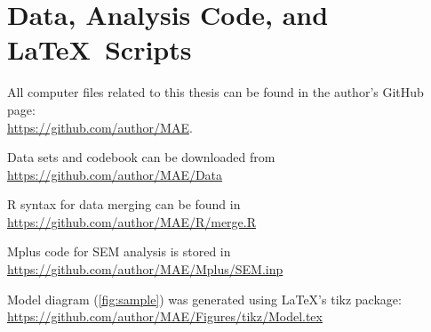 \section{Data, Analysis Code, and \LaTeX\ Scripts}
\label{app:B}

\MAEindent

All computer files related to this thesis can be found in the author's GitHub page:\\
\href{https://github.com/author/MAE}{https://github.com/author/MAE}.

\begin{MAEitemize}
\item Data sets and codebook can be downloaded from \href{https://github.com/author/MAE/Data}{https://github.com/author/MAE/Data}
\item R syntax for data merging can be found in \href{https://github.com/author/MAE/R/merge.R}{https://github.com/author/MAE/R/merge.R}
\item Mplus code for SEM analysis is stored in \href{https://github.com/author/MAE/Mplus/SEM.inp}{https://github.com/author/MAE/Mplus/SEM.inp}
\item Model diagram (\cref{fig:sample}) was generated using \LaTeX's tikz package: \href{https://github.com/author/MAE/Figures/tikz/Model.tex}{https://github.com/author/MAE/Figures/tikz/Model.tex}
\end{MAEitemize}
